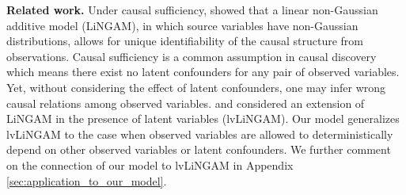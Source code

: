 \documentclass[12pt]{article}
\begin{document}


{\bf{Related work.}} Under causal sufficiency, \citet{shimizu2006linear} showed that a linear non-Gaussian additive model (LiNGAM), in which source variables have non-Gaussian distributions, allows for unique identifiability of the causal structure from observations. Causal sufficiency is a common assumption in causal discovery which means there exist no latent confounders for any pair of observed variables. Yet, without considering the effect of latent confounders, one may infer wrong causal relations among observed variables. \citet{hoyer2008estimation} and \citet{salehkaleybar2020learning} considered an extension of LiNGAM in the presence of latent variables (lvLiNGAM). Our model generalizes lvLiNGAM to the case when observed variables are allowed to deterministically depend on other observed variables or latent confounders. We further comment on the connection of our model to lvLiNGAM in Appendix \ref{sec:application_to_our_model}. 
\end{document}
